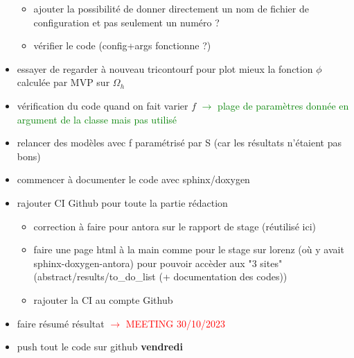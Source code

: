 \begin{itemize}[label=$\square$]
\begin{itemize}[label=\LARGE $\circ$]
		\item ajouter la possibilité de donner directement un nom de fichier de configuration et pas seulement un numéro ?
		\item vérifier le code (config+args fonctionne ?)
	\end{itemize}
	\item essayer de regarder à nouveau tricontourf pour plot mieux la fonction $\phi$ calculée par MVP sur $\Omega_h$
	\item[\done] vérification du code quand on fait varier $f$ \textcolor{Green}{$\rightarrow$ plage de paramètres donnée en argument de la classe mais pas utilisé}
	\item relancer des modèles avec f paramétrisé par S (car les résultats n'étaient pas bons)
	\item commencer à documenter le code avec sphinx/doxygen
	\item rajouter CI Github pour toute la partie rédaction
	\begin{itemize}[label=\LARGE $\circ$]
		\item correction à faire pour antora sur le rapport de stage (réutilisé ici)
		\item faire une page html à la main comme pour le stage sur lorenz (où y avait sphinx-doxygen-antora) pour pouvoir accèder aux "3 sites" (abstract/results/to\_do\_list (+ documentation des codes))
		\item rajouter la CI au compte Github
	\end{itemize}
	\item[\done] faire résumé résultat \textcolor{red}{$\rightarrow$ MEETING 30/10/2023} 
	\item push tout le code sur github \textbf{vendredi}
\end{itemize}